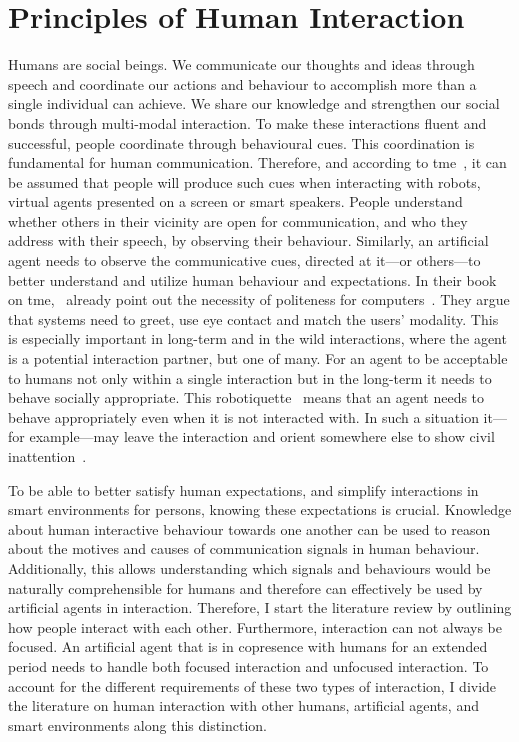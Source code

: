\chapter{Principles of Human Interaction}\label{sec.rw}
Humans are social beings.
We communicate our thoughts and ideas through speech and coordinate our actions and behaviour to accomplish more than a single individual can achieve.
We share our knowledge and strengthen our social bonds through multi-modal interaction.
To make these interactions fluent and successful, people coordinate through behavioural cues.
This coordination is fundamental for human communication.
Therefore, and according to \gls{tme}~\cite{Reeves1996}, it can be assumed that people will produce such cues when interacting with \glspl{robot}, \glspl{virtual agent} presented on a screen or smart speakers.
People understand whether others in their vicinity are open for communication, and who they address with their speech, by observing their behaviour.
Similarly, an \gls{artificial agent} needs to observe the communicative cues, directed at it---or others---to better understand and utilize human behaviour and expectations.
In their book on \gls{tme},~ already point out the necessity of politeness for computers~\cite{Reeves1996}.
They argue that systems need to greet, use eye contact and match the users' modality.
This is especially important in long-term and \gls{in the wild} interactions, where the agent is a potential interaction partner, but one of many.
For an agent to be acceptable to humans not only within a single interaction but in the long-term it needs to behave socially appropriate.
This \gls{robotiquette}~\cite[]{dautenhahn2007socially} means that an agent needs to behave appropriately even when it is not interacted with.
In such a situation it---for example---may leave the interaction and orient somewhere else to show \gls{civil inattention}~\cite[]{goffman1963}.

To be able to better satisfy human expectations, and simplify interactions in \glspl{smart environment} for \naive{} persons, knowing these expectations is crucial.
Knowledge about human interactive behaviour towards one another can be used to reason about the motives and causes of communication signals in human behaviour.
Additionally, this allows understanding which signals and behaviours would be naturally comprehensible for humans and therefore can effectively be used by \glspl{artificial agent} in interaction.
Therefore, I start the literature review by outlining how people interact with each other.
Furthermore, interaction can not always be focused.
An \gls{artificial agent} that is in \gls{copresence} with humans for an extended period needs to handle both \gls{focused interaction} and \gls{unfocused interaction}.
To account for the different requirements of these two types of interaction, I divide the literature on human interaction with other humans, \glspl{artificial agent}, and \glspl{smart environment} along this distinction.


